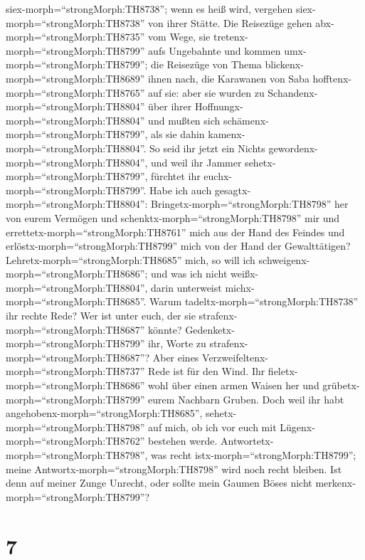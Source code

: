 siex-morph=``strongMorph:TH8738''; wenn es heiß wird, vergehen
siex-morph=``strongMorph:TH8738'' von ihrer Stätte.  Die
Reisezüge gehen abx-morph=``strongMorph:TH8735'' vom Wege, sie
tretenx-morph=``strongMorph:TH8799'' aufs Ungebahnte und kommen
umx-morph=``strongMorph:TH8799'';  die Reisezüge von Thema
blickenx-morph=``strongMorph:TH8689'' ihnen nach, die Karawanen von Saba
hofftenx-morph=``strongMorph:TH8765'' auf sie:  aber sie
wurden zu Schandenx-morph=``strongMorph:TH8804'' über ihrer
Hoffnungx-morph=``strongMorph:TH8804'' und mußten sich
schämenx-morph=``strongMorph:TH8799'', als sie dahin
kamenx-morph=``strongMorph:TH8804''.  So seid ihr jetzt ein
Nichts gewordenx-morph=``strongMorph:TH8804'', und weil ihr Jammer
sehetx-morph=``strongMorph:TH8799'', fürchtet ihr
euchx-morph=``strongMorph:TH8799''.  Habe ich auch
gesagtx-morph=``strongMorph:TH8804'':
Bringetx-morph=``strongMorph:TH8798'' her von eurem Vermögen und
schenktx-morph=``strongMorph:TH8798'' mir  und
errettetx-morph=``strongMorph:TH8761'' mich aus der Hand des Feindes und
erlöstx-morph=``strongMorph:TH8799'' mich von der Hand der
Gewalttätigen?  Lehretx-morph=``strongMorph:TH8685'' mich,
so will ich schweigenx-morph=``strongMorph:TH8686''; und was ich nicht
weißx-morph=``strongMorph:TH8804'', darin unterweist
michx-morph=``strongMorph:TH8685''.  Warum
tadeltx-morph=``strongMorph:TH8738'' ihr rechte Rede? Wer ist unter
euch, der sie strafenx-morph=``strongMorph:TH8687'' könnte?
 Gedenketx-morph=``strongMorph:TH8799'' ihr, Worte zu
strafenx-morph=``strongMorph:TH8687''? Aber eines
Verzweifeltenx-morph=``strongMorph:TH8737'' Rede ist für den Wind.
 Ihr fieletx-morph=``strongMorph:TH8686'' wohl über einen
armen Waisen her und grübetx-morph=``strongMorph:TH8799'' eurem Nachbarn
Gruben.  Doch weil ihr habt
angehobenx-morph=``strongMorph:TH8685'',
sehetx-morph=``strongMorph:TH8798'' auf mich, ob ich vor euch mit
Lügenx-morph=``strongMorph:TH8762'' bestehen werde. 
Antwortetx-morph=``strongMorph:TH8798'', was recht
istx-morph=``strongMorph:TH8799''; meine
Antwortx-morph=``strongMorph:TH8798'' wird noch recht bleiben.
 Ist denn auf meiner Zunge Unrecht, oder sollte mein Gaumen
Böses nicht merkenx-morph=``strongMorph:TH8799''?

\hypertarget{section-6}{%
\section{7}\label{section-6}}

